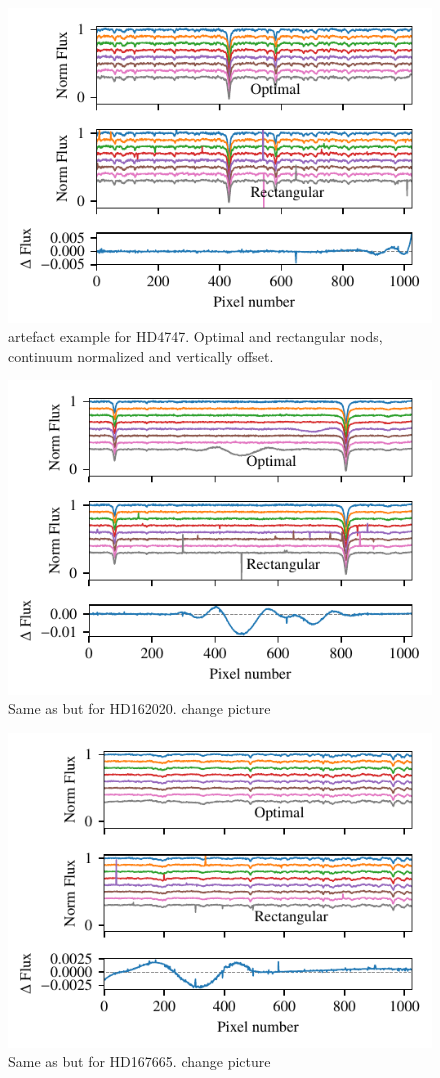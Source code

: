 \begin{figure}
     \centering
     \includegraphics[width=0.7\linewidth]{figures/reduction/bp_plots/extraction_comparision_HD4747-1_chip_1}
     \caption{artefact example for HD4747. Optimal and rectangular nods, continuum normalized and vertically offset.}
     \label{fig:artefact_example1}
 \end{figure}
 \begin{figure}
     \centering
     \includegraphics[width=0.7\linewidth]{figures/reduction/bp_plots/extraction_comparision_HD4747-1_chip_2}
     \caption{Same as  but for HD162020. {\red{} change picture}}
     \label{fig:artefact_example2}
 \end{figure}
 \begin{figure}
     \centering
     \includegraphics[width=0.7\linewidth]{figures/reduction/bp_plots/extraction_comparision_HD4747-1_chip_3}
     \caption{Same as  but for HD167665. {\red{} change picture}}
     \label{fig:artefact_example3}
 \end{figure}
